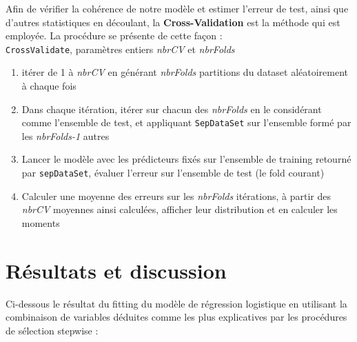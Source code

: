 \documentclass[]{article}
\begin{document}
Afin de vérifier la cohérence de notre modèle et estimer l'erreur de test, ainsi que d'autres statistiques en découlant, la \textbf{Cross-Validation} est la méthode qui est employée. La procédure se présente de cette façon :
~\\
\indent \texttt{CrossValidate}, paramètres entiers \textit{nbrCV} et \textit{nbrFolds}
\begin{enumerate}
\item itérer de 1 à \textit{nbrCV} en générant \textit{nbrFolds} partitions du dataset aléatoirement à chaque fois
\item Dans chaque itération, itérer sur chacun des \textit{nbrFolds} en le considérant comme l'ensemble de test, et appliquant \texttt{SepDataSet} sur l'ensemble formé par les \textit{nbrFolds-1} autres
\item Lancer le modèle avec les prédicteurs fixés sur l'ensemble de training retourné par \texttt{sepDataSet}, évaluer l'erreur sur l'ensemble de test (le fold courant)
\item Calculer une moyenne des erreurs sur les \textit{nbrFolds} itérations, à partir des \textit{nbrCV} moyennes ainsi calculées, afficher leur distribution et en calculer les moments
\end{enumerate}

\newpage

\section{Résultats et discussion}

Ci-dessous le résultat du fitting du modèle de régression logistique en utilisant la combinaison de variables déduites comme les plus explicatives par les procédures de sélection stepwise :
\end{document}
